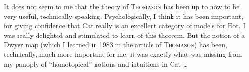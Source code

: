 It does not seem to me that the theory of \textsc{Thomason} has been up to now to be very useful, technically speaking. Psychologically, I think it has been important, for giving confidence that Cat really is an excellent category of models for Hot. I was really delighted and stimulated to learn of this theorem. But the notion of a Dwyer map (which I learned in 1983 in the article of \textsc{Thomason}) has been, technically, much more important for me: it was exactly what was missing from my panoply of ``homotopical'' notions and intuitions in Cat \dots
